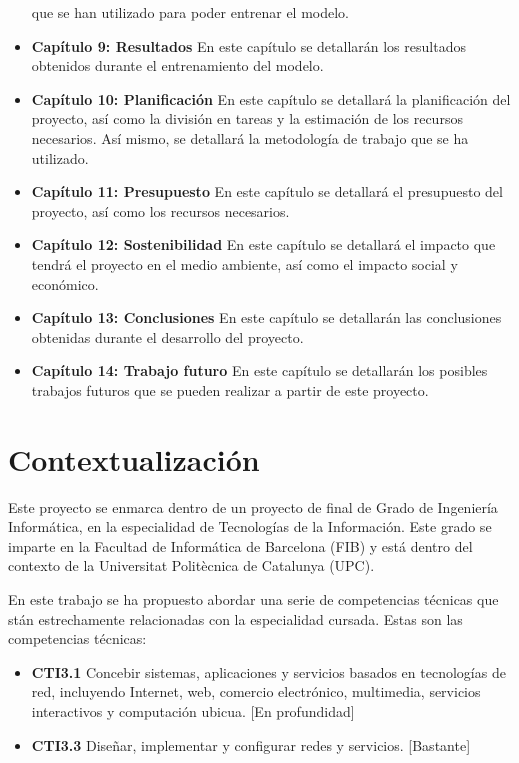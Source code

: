\begin{itemize}
        que se han utilizado para poder entrenar el modelo.
    \item \textbf{Capítulo 9: Resultados} En este capítulo se detallarán los resultados
        obtenidos durante el entrenamiento del modelo.
    \item \textbf{Capítulo 10: Planificación} En este capítulo se detallará la planificación
        del proyecto, así como la división en tareas y la estimación de los recursos
        necesarios. Así mismo, se detallará la metodología de trabajo que se ha utilizado.
    \item \textbf{Capítulo 11: Presupuesto} En este capítulo se detallará el presupuesto
        del proyecto, así como los recursos necesarios.
    \item \textbf{Capítulo 12: Sostenibilidad} En este capítulo se detallará el impacto
        que tendrá el proyecto en el medio ambiente, así como el impacto social y económico.
    \item \textbf{Capítulo 13: Conclusiones} En este capítulo se detallarán las conclusiones
        obtenidas durante el desarrollo del proyecto.
    \item \textbf{Capítulo 14: Trabajo futuro} En este capítulo se detallarán los posibles
        trabajos futuros que se pueden realizar a partir de este proyecto.
\end{itemize}

\section{Contextualización}
\label{sec:contextualizacion}


Este proyecto se enmarca dentro de un proyecto de final de Grado de Ingeniería
Informática, en la especialidad de Tecnologías de la Información. Este grado se
imparte en la Facultad de Informática de Barcelona (FIB) y está dentro del contexto
de la Universitat Politècnica de Catalunya (UPC).

En este trabajo se ha propuesto abordar una serie de competencias técnicas que 
stán estrechamente relacionadas con la especialidad cursada. Estas son las 
competencias técnicas:

\begin{itemize}
    \item \textbf{CTI3.1} Concebir sistemas, aplicaciones y servicios basados en
        tecnologías de red, incluyendo Internet, web, comercio electrónico,
        multimedia, servicios interactivos y computación ubicua. [En profundidad]
    \item \textbf{CTI3.3} Diseñar, implementar y configurar redes y servicios. [Bastante]
\end{itemize}

